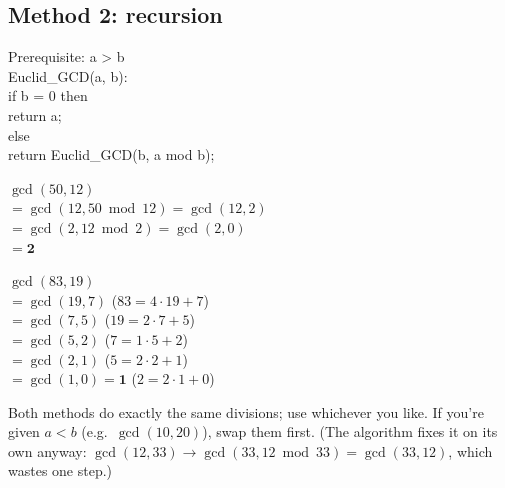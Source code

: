 \subsection{Method 2: recursion}
\begin{center}
\begin{minipage}{0.45\textwidth}
\small\ttfamily
Prerequisite: a > b\\
Euclid\_GCD(a, b):\\
\hspace*{1.5em}if b = 0 then\\
\hspace*{3em}return a;\\
\hspace*{1.5em}else\\
\hspace*{3em}return Euclid\_GCD(b, a mod b);
\end{minipage}
\end{center}
\begin{minipage}[t]{0.42\textwidth}
\small
\textbf{$\gcd(50, 12)$}\\
$= \gcd(12, 50 \bmod 12) = \gcd(12, 2)$\\
$= \gcd(2, 12 \bmod 2) = \gcd(2, 0)$\\
$= \mathbf{2}$
\end{minipage}\hfill
\begin{minipage}[t]{0.55\textwidth}
\small
\textbf{$\gcd(83, 19)$}\\
$= \gcd(19, 7)$ \quad ($83 = 4\cdot19 + 7$)\\
$= \gcd(7, 5)$ \quad ($19 = 2\cdot7 + 5$)\\
$= \gcd(5, 2)$ \quad ($7 = 1\cdot5 + 2$)\\
$= \gcd(2, 1)$ \quad ($5 = 2\cdot2 + 1$)\\
$= \gcd(1, 0) = \mathbf{1}$ \quad ($2 = 2\cdot1 + 0$)
\end{minipage}

\medskip
Both methods do exactly the same divisions; use whichever you like. If you're given $a < b$ (e.g.\ $\gcd(10, 20)$), swap them first.
(The algorithm fixes it on its own anyway: $\gcd(12, 33) \to \gcd(33, 12 \bmod 33) = \gcd(33, 12)$, which wastes one step.)

